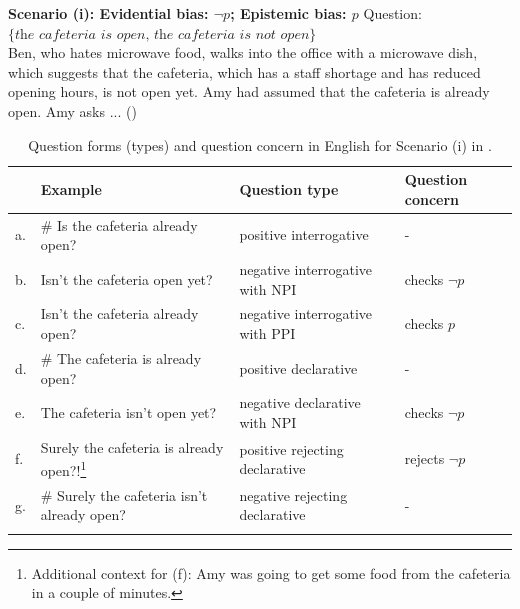 \documentclass[output=paper,colorlinks,citecolor=brown]{langscibook}
\begin{document}
\ea\label{ex:05:1}\textbf{Scenario (i): Evidential bias: $\neg p$; Epistemic bias: $p$}
\sn Question: $\{ \textit{the cafeteria is open, the cafeteria is not open} \}$\\
Ben, who hates microwave food, walks into the office with a microwave dish, which suggests that the cafeteria, which has a staff shortage and has reduced opening hours, is not open yet. Amy had assumed that the cafeteria is already open. Amy asks ... ()
\z
\begin{table}
\begin{tabularx}{\textwidth}{lQQl}
\lsptoprule
 & {Example} &  {Question type} &  {Question concern}\\
\midrule
a.&\# Is the cafeteria already  open? & {positive} interrogative & - \\
b.& Isn't the cafeteria open  yet? & {negative} interrogative with NPI & checks $\neg p$ \\
c.& Isn't the cafeteria already  open? & {negative} interrogative with PPI & checks $p$ \\
d.&\# The cafeteria is already  open? & {positive} declarative & - \\
e.& The cafeteria isn't open yet? & {negative} declarative with NPI & checks $\neg p$\\
f.& Surely the cafeteria is  already open?!\footnote{Additional context for (f): Amy was going to get some food from the cafeteria in a couple of minutes.} & {positive} rejecting declarative & rejects $\neg p$\\
g.&\# Surely the cafeteria isn't  already open? & {negative} rejecting declarative & - \\
\lspbottomrule
\end{tabularx}
\caption{Question forms (types) and question concern in English for Scenario (i) in .}
\label{tab:05:1}
\end{table}
\end{document}
